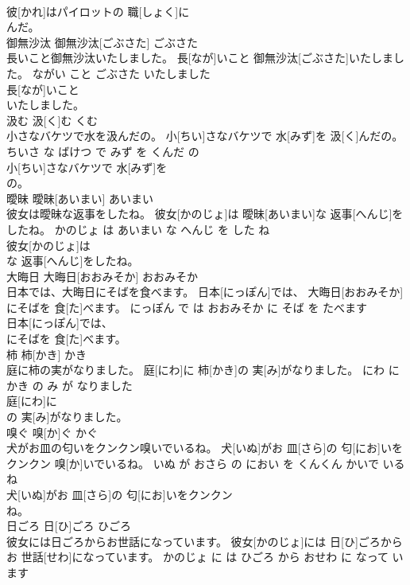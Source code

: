 \documentclass[8pt]{extreport}
\begin{document}
\begin{CJK}{UTF8}{min}
\\	彼[かれ]はパイロットの 職[しょく]に
\\	んだ。			
\\	御無沙汰	御無沙汰[ごぶさた]	ごぶさた	
\\	長いこと御無沙汰いたしました。	長[なが]いこと 御無沙汰[ごぶさた]いたしました。	ながい こと ごぶさた いたしました	
\\	長[なが]いこと
\\	いたしました。			
\\	汲む	汲[く]む	くむ	
\\	小さなバケツで水を汲んだの。	小[ちい]さなバケツで 水[みず]を 汲[く]んだの。	ちいさ な ばけつ で みず を くんだ の	
\\	小[ちい]さなバケツで 水[みず]を
\\	の。			
\\	曖昧	曖昧[あいまい]	あいまい	
\\	彼女は曖昧な返事をしたね。	彼女[かのじょ]は 曖昧[あいまい]な 返事[へんじ]をしたね。	かのじょ は あいまい な へんじ を した ね	
\\	彼女[かのじょ]は
\\	な 返事[へんじ]をしたね。			
\\	大晦日	大晦日[おおみそか]	おおみそか	
\\	日本では、大晦日にそばを食べます。	日本[にっぽん]では、 大晦日[おおみそか]にそばを 食[た]べます。	にっぽん で は おおみそか に そば を たべます	
\\	日本[にっぽん]では、
\\	にそばを 食[た]べます。			
\\	柿	柿[かき]	かき	
\\	庭に柿の実がなりました。	庭[にわ]に 柿[かき]の 実[み]がなりました。	にわ に かき の み が なりました	
\\	庭[にわ]に
\\	の 実[み]がなりました。			
\\	嗅ぐ	嗅[か]ぐ	かぐ	
\\	犬がお皿の匂いをクンクン嗅いでいるね。	犬[いぬ]がお 皿[さら]の 匂[にお]いをクンクン 嗅[か]いでいるね。	いぬ が おさら の におい を くんくん かいで いる ね	
\\	犬[いぬ]がお 皿[さら]の 匂[にお]いをクンクン
\\	ね。			
\\	日ごろ	日[ひ]ごろ	ひごろ	
\\	彼女には日ごろからお世話になっています。	彼女[かのじょ]には 日[ひ]ごろからお 世話[せわ]になっています。	かのじょ に は ひごろ から おせわ に なって います	

\end{CJK}
\end{document}
